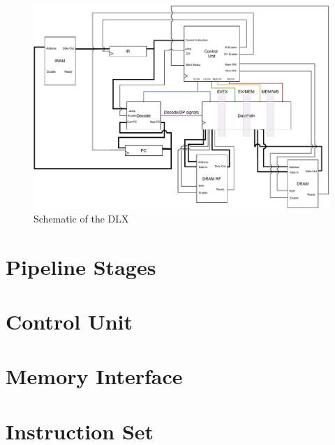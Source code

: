 \begin{figure}[ht]
    \centering
    \includegraphics[width=1\textwidth]{chapters/2_dlx/images/DLX.pdf}
    \caption{Schematic of the DLX}
    \label{DLX}
\end{figure} 
\newpage
\section{Pipeline Stages}
\section{Control Unit}
\section{Memory Interface}
\section{Instruction Set}